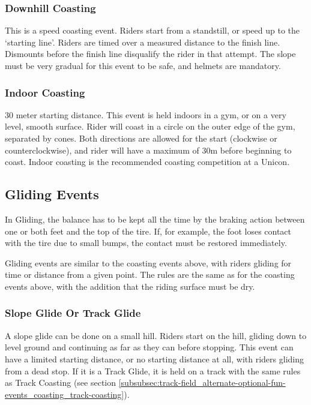 \subsubsection{Downhill Coasting}
This is a speed coasting event.
Riders start from a standstill, or speed up to the `starting line'.
Riders are timed over a measured distance to the finish line.
Dismounts before the finish line disqualify the rider in that attempt.
The slope must be very gradual for this event to be safe, and helmets are mandatory.

\subsubsection{Indoor Coasting}
30 meter starting distance.
This event is held indoors in a gym, or on a very level, smooth surface.
Rider will coast in a circle on the outer edge of the gym, separated by cones.
Both directions are allowed for the start (clockwise or counterclockwise), and rider will have a maximum of 30m before beginning to coast.
Indoor coasting is the recommended coasting competition at a Unicon.

\subsection{Gliding Events}

In Gliding, the balance has to be kept all the time by the braking action between one or both feet and the top of the tire.
If, for example, the foot loses contact with the tire due to small bumps, the contact must be restored immediately.

Gliding events are similar to the coasting events above, with riders gliding for time or distance from a given point.
The rules are the same as for the coasting events above, with the addition that the riding surface must be dry.

\subsubsection{Slope Glide Or Track Glide}
A slope glide can be done on a small hill.
Riders start on the hill, gliding down to level ground and continuing as far as they can before stopping.
This event can have a limited starting distance, or no starting distance at all, with riders gliding from a dead stop.
If it is a Track Glide, it is held on a track with the same rules as Track Coasting (see section \ref{subsubsec:track-field_alternate-optional-fun-events_coasting_track-coasting}).

